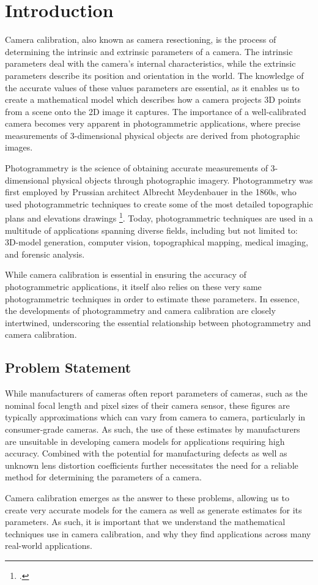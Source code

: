 \section{Introduction}

Camera calibration, also known as camera resectioning, is the process of determining the intrinsic and extrinsic parameters of a camera. The intrinsic parameters deal with the camera's internal characteristics, while the extrinsic parameters describe its position and orientation in the world. The knowledge of the accurate values of these values parameters are essential, as it enables us to create a mathematical model which describes how a camera projects 3D points from a scene onto the 2D image it captures. The importance of a well-calibrated camera becomes very apparent in photogrammetric applications, where precise measurements of 3-dimensional physical objects are derived from photographic images.

Photogrammetry is the science of obtaining accurate measurements of 3-dimensional physical objects through photographic imagery. Photogrammetry was first employed by Prussian architect Albrecht Meydenbauer in the 1860s, who used photogrammetric techniques to create some of the most detailed topographic plans and elevations drawings \footcite[][1]{albertzLookBack2007}. Today, photogrammetric techniques are used in a multitude of applications spanning diverse fields, including but not limited to: 3D-model generation, computer vision, topographical mapping, medical imaging, and forensic analysis. 

While camera calibration is essential in ensuring the accuracy of photogrammetric applications, it itself also relies on these very same photogrammetric techniques in order to estimate these parameters. In essence, the developments of photogrammetry and camera calibration are closely intertwined, underscoring the essential relationship between photogrammetry and camera calibration.

\subsection{Problem Statement}

While manufacturers of cameras often report parameters of cameras, such as the nominal focal length and pixel sizes of their camera sensor, these figures are typically approximations which can vary from camera to camera, particularly in consumer-grade cameras. As such, the use of these estimates by manufacturers are unsuitable in developing camera models for applications requiring high accuracy. Combined with the potential for manufacturing defects as well as unknown lens distortion coefficients further necessitates the need for a reliable method for determining the parameters of a camera. 

Camera calibration emerges as the answer to these problems, allowing us to create very accurate models for the camera as well as generate estimates for its parameters. As such, it is important that we understand the mathematical techniques use in camera calibration, and why they find applications across many real-world applications.
